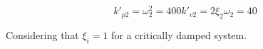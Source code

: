 \documentclass{exam}
\begin{document}
\begin{questions}
\begin{parts}
\begin{subequations}
  \begin{equation}
    k'_{p2} = \omega_2^2 = 400
  \end{equation}
  \begin{equation}
    k'_{v2} = 2 \xi_2 \omega_2 = 40
  \end{equation}
\end{subequations}

Considering that ${\xi_i = 1}$ for a critically damped system.

\end{parts}

\end{questions}
\end{document}
